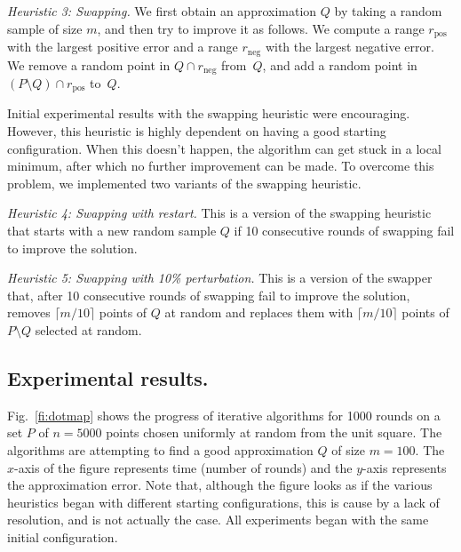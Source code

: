 \documentclass{elsart}
\newcommand{\mypos}{\mathrm{pos}}
\newcommand{\myneg}{\mathrm{neg}}
\begin{document}
\emph{Heuristic 3: Swapping.}
We first obtain an approximation $Q$ by taking a random sample of size
$m$, and then try to improve it as follows. We compute a range
$r_{\mypos}$ with the largest positive error and a range $r_{\myneg}$
with the largest negative error.  We remove a random point in $Q \cap
r_{\myneg}$ from~$Q$, and add a random point in $(P\setminus Q) \cap
r_{\mypos}$ to~$Q$.

Initial experimental results with the swapping heuristic were
encouraging. However, this heuristic is highly dependent on having a
good starting configuration.  When this doesn't happen, the algorithm
can get stuck in a local minimum, after which no further improvement
can be made.  To overcome this problem, we implemented two variants of
the swapping heuristic.

\emph{Heuristic 4: Swapping with restart.}
This is a version of the swapping heuristic that starts with a new
random sample $Q$ if 10 consecutive rounds of swapping fail to improve
the solution.

\emph{Heuristic 5: Swapping with 10\% perturbation.}
This is a version of the swapper that, after 10 consecutive rounds of
swapping fail to improve the solution, removes $\lceil m/10\rceil$
points of $Q$ at random and replaces them with $\lceil m/10\rceil$
points of $P\setminus Q$ selected at random.

\subsection{Experimental results.} 

Fig.~\ref{fi:dotmap} shows the progress of iterative algorithms for
1000 rounds on a set $P$ of $n=5000$ points chosen uniformly at random
from the unit square.  The algorithms are attempting to find a good
approximation $Q$ of size $m=100$.  The $x$-axis of the figure
represents time (number of rounds) and the $y$-axis represents the
approximation error.  Note that, although the figure looks as if the
various heuristics began with different starting configurations, this
is cause by a lack of resolution, and is not actually the case.  All
experiments began with the same initial configuration.
\end{document}
